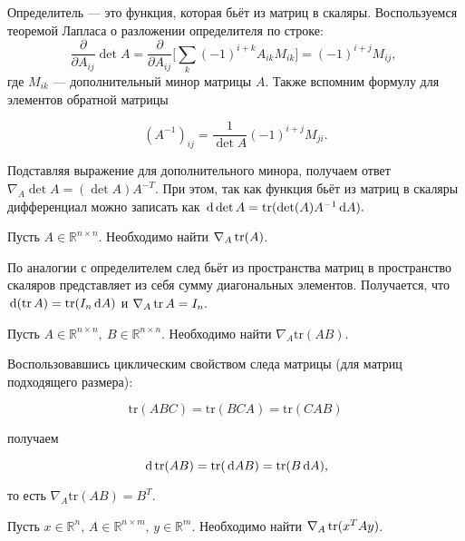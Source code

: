 \documentclass[12pt,fleqn]{article}
\newcommand{\dx}[1]{\,\mathrm{d}#1} %
\begin{document}
\begin{esSolution} Определитель --- это функция, которая бьёт из матриц в скаляры. Воспользуемся теоремой Лапласа о разложении определителя по строке:
    \[\frac{\partial}{\partial A_{ij}} \det A = \frac{\partial}{\partial A_{ij}}\bigg[\sum_k (-1)^{i+k}A_{ik}M_{ik}\bigg] = (-1)^{i+j}M_{ij}, \; \]
где $M_{ik}$ --- дополнительный минор матрицы $A$. Также вспомним формулу для элементов обратной матрицы
    
    \[(A^{-1})_{ij} = \frac{1}{\det A}(-1)^{i+j}M_{ji}.\]
    
    Подставляя выражение для дополнительного минора, получаем ответ $\nabla_A \det A = (\det A) A^{-T}$. При этом, так как функция бьёт из матриц в скаляры дифференциал можно записать как  $\dx{ \det A} = \Tr(\det (A) A^{-1} \dx{A}).$
\end{esSolution} 


\begin{vkProblem} Пусть $A \in \mathbb{R}^{n\times n}$. Необходимо найти $\nabla_A \mathop{\mathrm{tr}}(A)$.
\end{vkProblem}

\begin{esSolution} 
По аналогии с определителем след бьёт из пространства матриц в пространство скаляров представляет из себя сумму диагональных элементов. Получается, что $\dx{(\Tr A)} = \Tr(I_n \dx A)$ и $\nabla_A \mathop{\mathrm{tr}} A = I_n.$
\end{esSolution} 
    
\begin{vkProblem} Пусть $A \in \mathbb{R}^{n \times n},\ B \in \mathbb{R}^{n \times n}$. Необходимо найти $\nabla_A \text{tr}(AB)$. 
\end{vkProblem}

\begin{esSolution}
Воспользовавшись циклическим свойством следа матрицы (для матриц подходящего размера): 

\[
\text{tr}(ABC) = \text{tr}(BCA) = \text{tr}(CAB)
\]

получаем 

\[ 
\dx{\Tr(AB)} = \Tr(\dx{AB}) = \Tr(B\dx{A}),
\]

то есть $\nabla_A \text{tr}(AB) = B^T.$
\end{esSolution}


\begin{vkProblem} Пусть $x \in \mathbb{R}^n, \, A \in \mathbb{R}^{n \times m}, \, y \in \mathbb{R}^m.$ Необходимо найти $\nabla_A \mathop{\mathrm{tr}}(x^TAy)$. 
\end{vkProblem}
\end{document}
